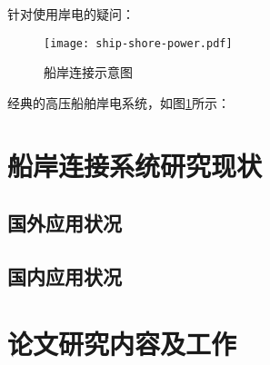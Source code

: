 针对使用岸电的疑问：
\begin{figure}[!htp]
	\centering
	\texttt{[image: ship-shore-power.pdf]}
	\caption{船岸连接示意图}
	\label{fig:ship-shore-power1}
\end{figure}

经典的高压船舶岸电系统，如图\ref{fig:ship-shore-power1}所示：




\section{船岸连接系统研究现状}

\subsection{国外应用状况}

\subsection{国内应用状况}

\section{论文研究内容及工作}


